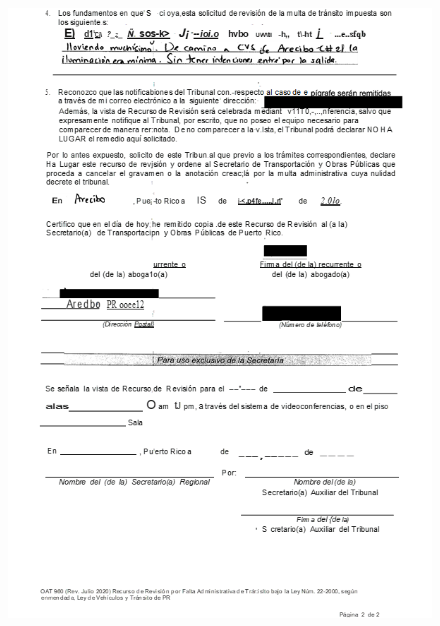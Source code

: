 \documentclass{article}
\begin{document}
\begin{figure}[H]
	\centering
	\includegraphics[width=\textwidth]{../sample_translations/source_1_2.png}
\end{figure}
\end{document}
